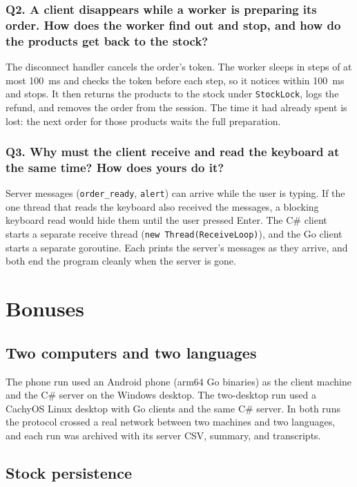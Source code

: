 \documentclass[12pt,a4paper]{article}
\begin{document}
    \subsubsection{Q2. A client disappears while a worker is preparing its order. How does the worker find out and stop, and how do the products get back to the stock?}
    The disconnect handler cancels the order's token. The worker sleeps in steps of at
    most 100~ms and checks the token before each step, so it notices within 100~ms and
    stops. It then returns the products to the stock under \texttt{StockLock}, logs the
    refund, and removes the order from the session. The time it had already spent is
    lost: the next order for those products waits the full preparation.

    \subsubsection{Q3. Why must the client receive and read the keyboard at the same time? How does yours do it?}
    Server messages (\texttt{order\_ready}, \texttt{alert}) can arrive while the user is
    typing. If the one thread that reads the keyboard also received the messages, a
    blocking keyboard read would hide them until the user pressed Enter. The C\# client
    starts a separate receive thread (\texttt{new Thread(ReceiveLoop)}), and the Go client
    starts a separate goroutine. Each prints the server's messages as they arrive, and
    both end the program cleanly when the server is gone.

\section{Bonuses}
\label{sec:bonus}

\subsection{Two computers and two languages}

The phone run used an Android phone (arm64 Go binaries) as the client machine and the
C\# server on the Windows desktop. The two-desktop run used a CachyOS Linux desktop
with Go clients and the same C\# server. In both runs the protocol crossed a real
network between two machines and two languages, and each run was archived with its
server CSV, summary, and transcripts.

\subsection{Stock persistence}
\end{document}
